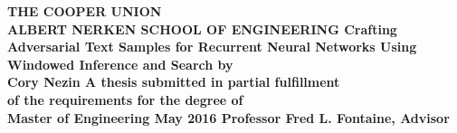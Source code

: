 {
\centering
\large\bf
THE COOPER UNION\\
ALBERT NERKEN SCHOOL OF ENGINEERING
\Large
\vskip 88pt
Crafting Adversarial Text Samples for Recurrent Neural Networks Using Windowed Inference and Search
\vskip 88pt
by\\
Cory Nezin
\vskip 88pt
A thesis submitted in partial fulfillment\\
of the requirements for the degree of\\
Master of Engineering
\vskip 88pt
May 2016
\vskip 88pt
Professor Fred L. Fontaine, Advisor

}
